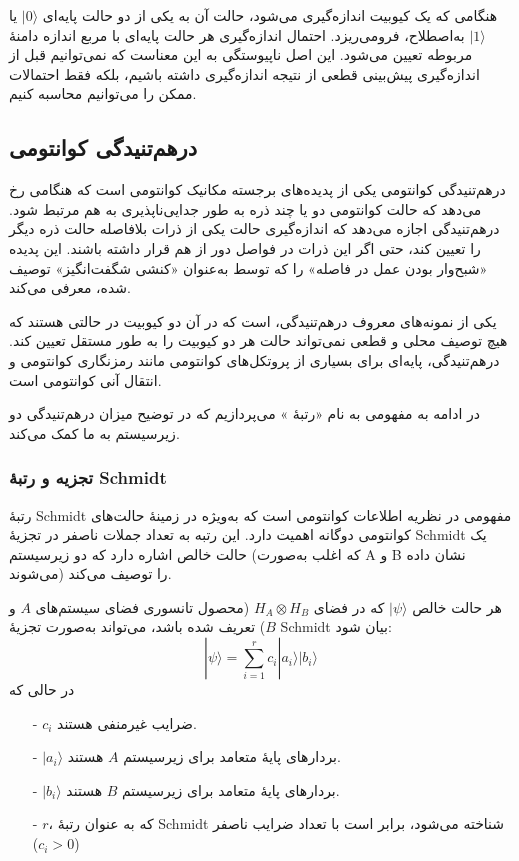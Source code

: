 هنگامی که یک کیوبیت اندازه‌گیری می‌شود، حالت آن به یکی از دو حالت پایه‌ای $|0\rangle$ یا $|1\rangle$ به‌اصطلاح، فرومی‌ریزد. احتمال اندازه‌گیری هر حالت پایه‌ای با مربع اندازه دامنهٔ مربوطه تعیین می‌شود. این اصل ناپیوستگی به این معناست که نمی‌توانیم قبل از اندازه‌گیری پیش‌بینی قطعی از نتیجه اندازه‌گیری داشته باشیم، بلکه فقط احتمالات ممکن را می‌توانیم محاسبه کنیم.

\subsection{درهم‌تنیدگی کوانتومی}
درهم‌تنیدگی کوانتومی یکی از پدیده‌های برجسته مکانیک کوانتومی است که هنگامی رخ می‌دهد که حالت کوانتومی دو یا چند ذره به طور جدایی‌ناپذیری به هم مرتبط شود. درهم‌تنیدگی اجازه می‌دهد که اندازه‌گیری حالت یکی از ذرات بلافاصله حالت ذره دیگر را تعیین کند، حتی اگر این ذرات در فواصل دور از هم قرار داشته باشند. این پدیده «شبح‌وار بودن عمل در فاصله» را که توسط  به‌عنوان «کنشی شگفت‌انگیز» توصیف شده، معرفی می‌کند.

یکی از نمونه‌های معروف درهم‌تنیدگی،  است که در آن دو کیوبیت در حالتی هستند که هیچ توصیف محلی و قطعی نمی‌تواند حالت هر دو کیوبیت را به طور مستقل تعیین کند. درهم‌تنیدگی، پایه‌ای برای بسیاری از پروتکل‌های کوانتومی مانند رمزنگاری کوانتومی و انتقال آنی کوانتومی است.

در ادامه به مفهومی به نام «رتبهٔ » می‌پردازیم که در توضیح میزان در‌هم‌تنیدگی دو زیرسیستم به ما کمک می‌کند.

\subsubsection{تجزیه و رتبهٔ Schmidt}
رتبهٔ Schmidt مفهومی در نظریه اطلاعات کوانتومی است که به‌ویژه در زمینهٔ حالت‌های کوانتومی دوگانه اهمیت دارد. این رتبه به تعداد جملات ناصفر در تجزیهٔ Schmidt یک حالت خالص اشاره دارد که دو زیرسیستم (که اغلب به‌صورت A و B نشان داده می‌شوند) را توصیف می‌کند.

هر حالت خالص \(|\psi\rangle\) که در فضای \(H_A \otimes H_B\) (محصول تانسوری فضای سیستم‌های $A$ و $B$) تعریف شده باشد، می‌تواند به‌صورت تجزیهٔ Schmidt بیان شود:
\[
|\psi\rangle = \sum_{i=1}^{r} c_i |a_i\rangle |b_i\rangle
\]
در حالی که

\begin{itemize}
	\item[-] \(c_i\) ضرایب غیرمنفی هستند.
	\item[-] \(|a_i\rangle\) بردارهای پایهٔ متعامد برای زیرسیستم $A$ هستند.
	\item[-] \(|b_i\rangle\) بردارهای پایهٔ متعامد برای زیرسیستم $B$ هستند.
	\item[-] \(r\)، که به عنوان رتبهٔ Schmidt شناخته می‌شود، برابر است با تعداد ضرایب ناصفر (\(c_i > 0\))
\end{itemize}


